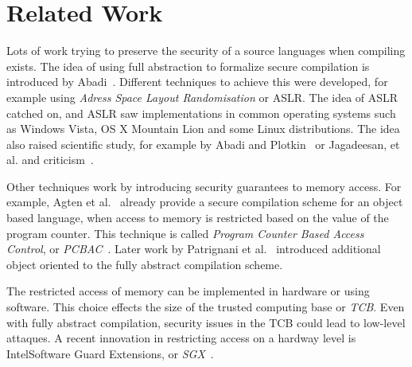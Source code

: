 \chapter{Related Work}

Lots of work trying to preserve the security of a source languages when compiling exists.
The idea of using full abstraction to formalize secure compilation is introduced by Abadi~\cite{Abadi}.
Different techniques to achieve this were developed, for example using \emph{Adress Space Layout Randomisation} or ASLR.%
The idea of ASLR catched on, and ASLR saw implementations in common operating systems such as Windows Vista, OS X Mountain Lion and some Linux distributions. 
The idea also raised scientific study, for example by Abadi and Plotkin~\cite{AbadiASLR} or Jagadeesan, et al.\cite{Jagadeesan} and criticism~\cite{Shacham:2004:EAR:1030083.1030124,Strackx:2009:BMS:1519144.1519145}.

Other techniques work by introducing security guarantees to memory access.
For example, Agten et al.~\cite{Agten:2012:SCM:2354412.2355247} already provide a secure compilation scheme for an object based language, when access to memory is restricted based on the value of the program counter. This technique is called \emph{Program Counter Based Access Control}, or \emph{PCBAC}~\cite{PCBAC}.
Later work by Patrignani et al.~\cite{Patrignani} introduced additional object oriented to the fully abstract compilation scheme.

The restricted access of memory can be implemented in hardware\cite{Sancus,SGX} or using software\cite{Fides,Salus}.
This choice effects the size of the trusted computing base or \emph{TCB}.
Even with fully abstract compilation, security issues in the TCB could lead to low-level attaques.
A recent innovation in restricting access on a hardway level is Intel\textregistered Software Guard Extensions, or \emph{SGX}~\cite{SGX}.